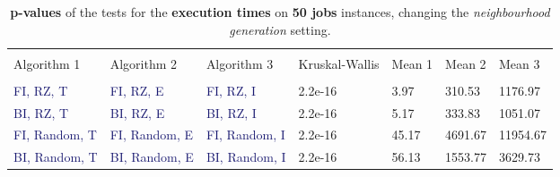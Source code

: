 \documentclass[
12pt,
a4paper,
oneside,
headinclude,
footinclude]{article}
\theoremstyle{definition} %
\begin{document}
\begin{table}[H]
    \hspace*{-1.8cm}
    \begin{tabular}{l l l l l l l} %
        \hline
        \hline 
        \\[-1.5ex]
        \textcolor{BrickRed}{Algorithm 1} & \textcolor{BrickRed}{Algorithm 2}  & \textcolor{BrickRed}{Algorithm 3} & \textcolor{BrickRed}{Kruskal-Wallis} & \textcolor{BrickRed}{Mean 1} & \textcolor{BrickRed}{Mean 2} & \textcolor{BrickRed}{Mean 3}\\ [0.5ex]
        \hline %
        \\[-1.5ex]
        
           \textcolor{MidnightBlue}{FI, RZ, T}     & \textcolor{MidnightBlue}{FI, RZ, E}     & \textcolor{MidnightBlue}{FI, RZ, I} & 2.2e-16 & 3.97 & 310.53 & 1176.97 \\ 
           \textcolor{MidnightBlue}{BI, RZ, T}     & \textcolor{MidnightBlue}{BI, RZ, E}     & \textcolor{MidnightBlue}{BI, RZ, I} & 2.2e-16 & 5.17 & 333.83 & 1051.07 \\ 
           \textcolor{MidnightBlue}{FI, Random, T} & \textcolor{MidnightBlue}{FI, Random, E} & \textcolor{MidnightBlue}{FI, Random, I} & 2.2e-16 & 45.17 & 4691.67 & 11954.67 \\ 
           \textcolor{MidnightBlue}{BI, Random, T} & \textcolor{MidnightBlue}{BI, Random, E} & \textcolor{MidnightBlue}{BI, Random, I} & 2.2e-16 & 56.13 & 1553.77 & 3629.73 \\ 
        [1ex] %
        \hline %
    \end{tabular}
    \caption{\label{tab:ii-n50exec}\textbf{p-values} of the tests for the \textbf{execution times} on \textbf{50 jobs} instances, changing the \textit{neighbourhood generation} setting.}
\end{table} 
\end{document}
